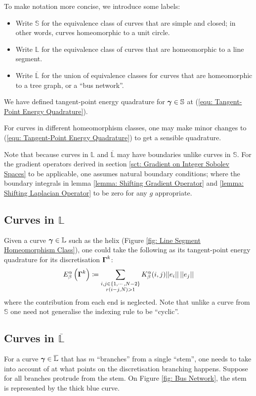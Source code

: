 \documentclass[../dissertation.tex]{subfiles}
\begin{document}
To make notation more concise, we introduce some labels:
\begin{itemize}
    \item Write $\mathbb{S}$ for the equivalence class of curves that are simple and closed; in other words, curves homeomorphic to a unit circle.
    \item Write $\mathbb{L}$ for the equivalence class of curves that are homeomorphic to a line segment.
    \item Write $\overline{\mathbb{L}}$ for the union of equivalence classes for curves that are homeomorphic to a tree graph, or a ``bus network''.
\end{itemize}

We have defined tangent-point energy quadrature for $\boldsymbol{\gamma} \in \mathbb{S}$ at (\ref{equ: Tangent-Point Energy Quadrature}).

For curves in different homeomorphism classes,
one may make minor changes to (\ref{equ: Tangent-Point Energy Quadrature}) to get a sensible quadrature.

Note that because curves in $\mathbb{L}$ and $\overline{\mathbb{L}}$ may have boundaries unlike curves in $\mathbb{S}$.
For the gradient operators derived in section \ref{sct: Gradient on Integer Sobolev Spaces} to be applicable, one assumes natural boundary conditions;
where the boundary integrals in lemma \ref{lemma: Shifting Gradient Operator} and \ref{lemma: Shifting Laplacian Operator} to be zero for any $g$ appropriate.
\subsection{Curves in $\mathbb{L}$}
\label{sct: Curves in L}
Given a curve $\boldsymbol{\gamma} \in \mathbb{L}$ such as the helix (Figure \ref{fig: Line Segment Homeomorphism Class}),
one could take the following as its tangent-point energy quadrature for its discretisation $\boldsymbol{\Gamma}^k$:
\begin{equation}
    E_{\beta}^{\alpha} \left( \boldsymbol{\Gamma}^k \right) \coloneqq \sum_{\substack{i,j \in \left\{ 1, \cdots, N-2 \right\} \\ r\left( i-j,N \right) > 1}} K_{\beta}^{\alpha} (i,j) \lvert \lvert e_i \rvert \rvert \, \lvert \lvert e_j \rvert \rvert
\end{equation}
where the contribution from each end is neglected.
Note that unlike a curve from $\mathbb{S}$
one need not generalise the indexing rule to be ``cyclic''.

\subsection{Curves in $\overline{\mathbb{L}}$}
For a curve $\boldsymbol{\gamma} \in \overline{\mathbb{L}}$ that has $m$ ``branches'' from a single ``stem'', one needs to take into account of at what points on the discretisation branching happens.
Suppose for all branches protrude from the stem.
On Figure \ref{fig: Bus Network}, the stem is represented by the thick blue curve.
\end{document}
